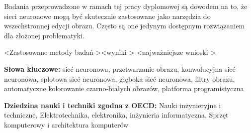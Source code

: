   Badania przeprowadzone w ramach tej pracy dyplomowej są dowodem na to, że
  sieci neuronowe mogą być skutecznie zastosowane jako narzędzia do wszechstronnej
  edycji obrazu. Często są one jedynym dostępnym rozwiązaniem dla złożonej
  problematyki.

  \textless Zastosowane metody badań \textgreater \textless wyniki \textgreater
  \textless najważniejsze wnioski \textgreater

  \bigskip

  \noindent\textbf{Słowa kluczowe:} sieć neuronowa, przetwarzanie obrazu,
  konwolucyjna sieć neuronowa, splotowa sieć neuronowa,
  głęboka sieć neuronowa, filtry obrazu, automatyczne kolorowanie czarno-białych
  obrazów, platforma programistyczna

  \bigskip

  \noindent\textbf{Dziedzina nauki i techniki zgodna z OECD:} Nauki
  inżynieryjne i techniczne, Elektrotechnika, elektronika, inżynieria
  informatyczna, Sprzęt komputerowy i architektura komputerów
